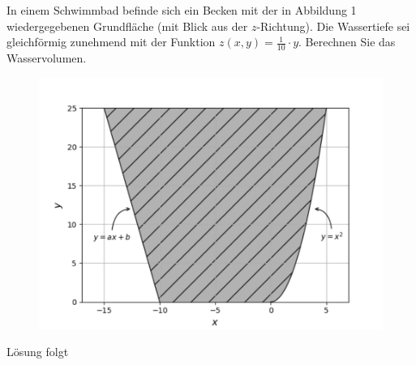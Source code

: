 \documentclass{atistandalonetask}
\begin{document}
	  \begin{atiTask}[
  title = Volumen eines Schwimmbeckens
	]
In einem Schwimmbad befinde sich ein Becken mit der in Abbildung 1 wiedergegebenen Grundfläche (mit Blick aus der $z$-Richtung). Die Wassertiefe sei gleichförmig zunehmend mit der Funktion $z(x,y)=\frac{1}{10}\cdot y$. Berechnen Sie das Wasservolumen.
\begin{figure}[h]
\centering
\includegraphics[width=0.5\linewidth]{./picture-dreifachintegral}
\label{fig:picture-dreifachintegral}
\end{figure}


\end{atiTask}

 \begin{atiSolution}
   	Lösung folgt
  \end{atiSolution}
\end{document}
